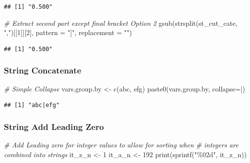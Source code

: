 \documentclass[
]{book}
\newenvironment{Shaded}{\begin{snugshade}}{\end{snugshade}}
\newcommand{\AttributeTok}[1]{\textcolor[rgb]{0.77,0.63,0.00}{#1}}
\newcommand{\CommentTok}[1]{\textcolor[rgb]{0.56,0.35,0.01}{\textit{#1}}}
\newcommand{\DecValTok}[1]{\textcolor[rgb]{0.00,0.00,0.81}{#1}}
\newcommand{\FunctionTok}[1]{\textcolor[rgb]{0.00,0.00,0.00}{#1}}
\newcommand{\NormalTok}[1]{#1}
\newcommand{\OtherTok}[1]{\textcolor[rgb]{0.56,0.35,0.01}{#1}}
\newcommand{\StringTok}[1]{\textcolor[rgb]{0.31,0.60,0.02}{#1}}
\begin{document}
\begin{verbatim}
## [1] "0.500"
\end{verbatim}

\begin{Shaded}
\begin{Highlighting}[]
\CommentTok{\# Extract second part except final bracket Option 2}
\FunctionTok{gsub}\NormalTok{(}\FunctionTok{strsplit}\NormalTok{(st\_cut\_cate, }\StringTok{","}\NormalTok{)[[}\DecValTok{1}\NormalTok{]][}\DecValTok{2}\NormalTok{],  }\AttributeTok{pattern =} \StringTok{"]"}\NormalTok{, }\AttributeTok{replacement =} \StringTok{""}\NormalTok{)}
\end{Highlighting}
\end{Shaded}

\begin{verbatim}
## [1] "0.500"
\end{verbatim}

\hypertarget{string-concatenate}{%
\subsubsection{String Concatenate}\label{string-concatenate}}

\begin{Shaded}
\begin{Highlighting}[]
\CommentTok{\# Simple Collapse}
\NormalTok{vars.group.by }\OtherTok{\textless{}{-}} \FunctionTok{c}\NormalTok{(}\StringTok{\textquotesingle{}abc\textquotesingle{}}\NormalTok{, }\StringTok{\textquotesingle{}efg\textquotesingle{}}\NormalTok{)}
\FunctionTok{paste0}\NormalTok{(vars.group.by, }\AttributeTok{collapse=}\StringTok{\textquotesingle{}|\textquotesingle{}}\NormalTok{)}
\end{Highlighting}
\end{Shaded}

\begin{verbatim}
## [1] "abc|efg"
\end{verbatim}

\hypertarget{string-add-leading-zero}{%
\subsubsection{String Add Leading Zero}\label{string-add-leading-zero}}

\begin{Shaded}
\begin{Highlighting}[]
\CommentTok{\# Add Leading zero for integer values to allow for sorting when}
\CommentTok{\# integers are combined into strings}
\NormalTok{it\_z\_n }\OtherTok{\textless{}{-}} \DecValTok{1}
\NormalTok{it\_a\_n }\OtherTok{\textless{}{-}} \DecValTok{192}
\FunctionTok{print}\NormalTok{(}\FunctionTok{sprintf}\NormalTok{(}\StringTok{"\%02d"}\NormalTok{, it\_z\_n))}
\end{Highlighting}
\end{Shaded}
\end{document}
